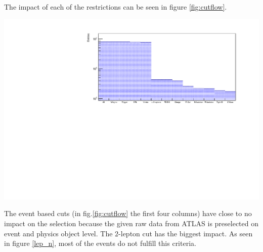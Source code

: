 \documentclass[12pt, a4paper, bibliography=totoc]{scrartcl}
\begin{document}
\begin{multicols}{2}
The impact of each of the restrictions can be seen in figure \ref{fig:cutflow}. 
\begin{center}
	\includegraphics[width=1.1\linewidth]{fig/cutflow_hist_final.pdf}
	\label{fig:cutflow}
\end{center}
The event based cuts (in fig.\ref{fig:cutflow} the first four columns) have close to no impact on the selection because the given raw data from ATLAS is preselected on event and physics object level.
The $2$-lepton cut has the biggest impact.
As seen in figure \ref{lep_n}, most of the events do not fulfill this criteria.



\end{multicols}
\end{document}
